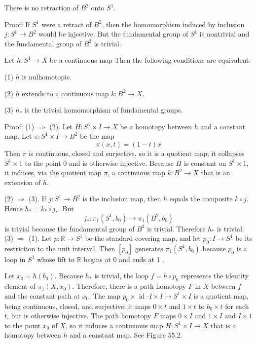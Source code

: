 \documentclass[12pt, a4paper, oneside]{book}
\begin{document}
\begin{theorem}
    There is no retraction of $B^2$ onto $S^1$.

    Proof:
    If $S^1$ were a retract of $B^2$, then the homomorphism induced by inclusion $j: S^1 \rightarrow B^2$ would be injective. But the fundamental group of $S^1$ is nontrivial and the fundamental group of $B^2$ is trivial.
\end{theorem}

\begin{lemma}
    Let $h: S^1 \rightarrow X$ be a continuous map Then the following conditions are equivalent:

    (1) $h$ is nulhomotopic.

    (2) $h$ extends to a continuous map $k: B^2 \rightarrow X$.

    (3) $h_*$ is the trivial homomorphism of fundamental groups.

    Proof:
    (1) $\Rightarrow$ (2). Let $H: S^1 \times I \rightarrow X$ be a homotopy between $h$ and a constant map. Let $\pi: S^1 \times I \rightarrow B^2$ be the map
    \begin{equation*}
        \pi(x, t)=(1-t) x
    \end{equation*}
    Then $\pi$ is continuous, closed and surjective, so it is a quotient map; it collapses $S^1 \times 1$ to the point 0 and is otherwise injective. Because $H$ is constant on $S^1 \times 1$, it induces, via the quotient map $\pi$, a continuous map $k: B^2 \rightarrow X$ that is an extension of $h$.

    (2) $\Rightarrow$ (3). If $j: S^1 \rightarrow B^2$ is the inclusion map, then $h$ equals the composite $k \circ j$. Hence $h_*=k_* \circ j_*$. But
    \begin{equation*}
        j_*: \pi_1\left(S^1, b_0\right) \rightarrow \pi_1\left(B^2, b_0\right)
    \end{equation*}
    is trivial because the fundamental group of $B^2$ is trivial. Therefore $h_*$ is trivial.
    (3) $\Rightarrow$ (1). Let $p: \mathbb{R} \rightarrow S^1$ be the standard covering map, and let $p_0: I \rightarrow S^1$ be its restriction to the unit interval. Then $\left[p_0\right]$ generates $\pi_1\left(S^1, b_0\right)$ because $p_0$ is a loop in $S^1$ whose lift to $\mathbb{R}$ begins at 0 and ends at 1 .

    Let $x_0=h\left(b_0\right)$. Because $h_*$ is trivial, the loop $f=h \circ p_0$ represents the identity element of $\pi_1\left(X, x_0\right)$. Therefore, there is a path homotopy $F$ in $X$ between $f$ and the constant path at $x_0$. The map $p_0 \times$ id $\cdot I \times I \rightarrow S^1 \times I$ is a quotient map, being continuous, closed, and surjective; it maps $0 \times t$ and $1 \times t$ to $b_0 \times t$ for each $t$, but is otherwise injective. The path homotopy $F$ maps $0 \times I$ and $1 \times I$ and $I \times 1$ to the point $x_0$ of $X$, so it induces a continuous map $H: S^1 \times I \rightarrow X$ that is a homotopy between $h$ and a constant map. See Figure 55.2.
\end{lemma}
\end{document}
